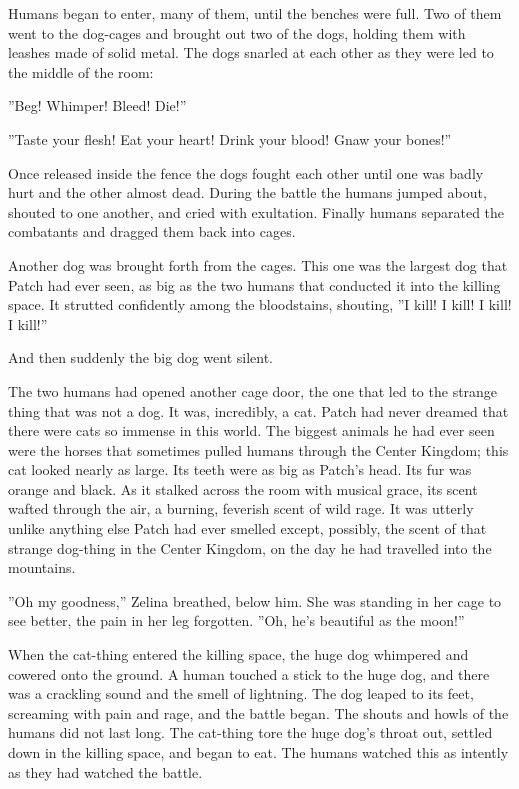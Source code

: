 \documentclass[12pt]{book}
\begin{document}
Humans began to enter, many of them, until the benches were full. Two of them went to the dog-cages and brought out two of the dogs, holding them with leashes made of solid metal. The dogs snarled at each other as they were led to the middle of the room:

''Beg! Whimper! Bleed! Die!''

''Taste your flesh! Eat your heart! Drink your blood! Gnaw your bones!''

Once released inside the fence the dogs fought each other until one was badly hurt and the other almost dead. During the battle the humans jumped about, shouted to one another, and cried with exultation. Finally humans separated the combatants and dragged them back into cages. 

Another dog was brought forth from the cages. This one was the largest dog that Patch had ever seen, as big as the two humans that conducted it into the killing space. It strutted confidently among the bloodstains, shouting, ''I kill! I kill! I kill! I kill!''

And then suddenly the big dog went silent.

The two humans had opened another cage door, the one that led to the strange thing that was not a dog. It was, incredibly, a cat. Patch had never dreamed that there were cats so immense in this world. The biggest animals he had ever seen were the horses that sometimes pulled humans through the Center Kingdom; this cat looked nearly as large. Its teeth were as big as Patch's head. Its fur was orange and black. As it stalked across the room with musical grace, its scent wafted through the air, a burning, feverish scent of wild rage. It was utterly unlike anything else Patch had ever smelled %
except, possibly, the scent of that strange dog-thing in the Center Kingdom, on the day he had travelled into the mountains.

''Oh my goodness,'' Zelina breathed, below him. She was standing in her cage to see better, the pain in her leg forgotten. ''Oh, he's beautiful as the moon!''

When the cat-thing entered the killing space, the huge dog whimpered and cowered onto the ground. A human touched a stick to the huge dog, and there was a crackling sound and the smell of lightning. The dog leaped to its feet, screaming with pain and rage, and the battle began. The shouts and howls of the humans did not last long. The cat-thing tore the huge dog's throat out, settled down in the killing space, and began to eat. The humans watched this as intently as they had watched the battle.
\end{document}

